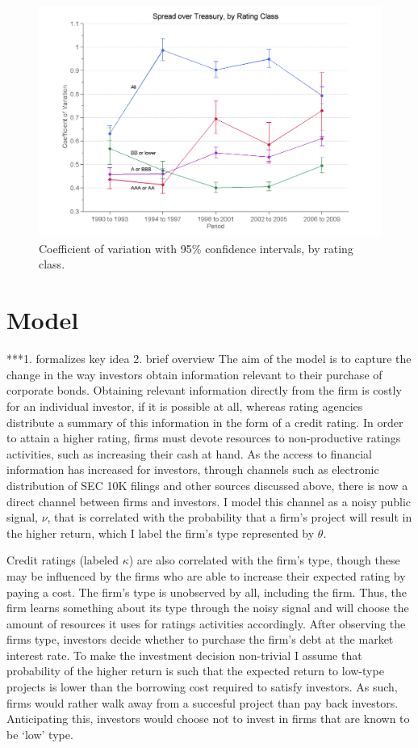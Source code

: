 \documentclass[titlepage]{article}
\begin{document}
\begin{figure}[ht]
\centering
\includegraphics[width=\textwidth]{CVCI.png}
\caption{Coefficient of variation with 95\% confidence intervals, by rating class.}
\label{fig:cov}
\end{figure}

\section{Model}
\label{sec:mod}
***1. formalizes key idea 2. brief overview
The aim of the model is to capture the change in the way investors obtain information relevant to their purchase of corporate bonds. Obtaining relevant information directly from the firm is costly for an individual investor, if it is possible at all, whereas rating agencies distribute a summary of this information in the form of a credit rating. In order to attain a higher rating, firms must devote resources to non-productive ratings activities, such as increasing their cash at hand. As the access to financial information has increased for investors, through channels such as electronic distribution of SEC 10K filings and other sources discussed above, there is now a direct channel between firms and investors. I model this channel as a noisy public signal, $\nu$, that is correlated with the probability that a firm's project will result in the higher return, which I label the firm's type represented by $\theta$. 

Credit ratings (labeled $\kappa$) are also correlated with the firm's type, though these may be influenced by the firms who are able to increase their expected rating by paying a cost. The firm's type is unobserved by all, including the firm. Thus, the firm learns something about its type through the noisy signal and will choose the amount of resources it uses for ratings activities accordingly. After observing the firms type, investors decide whether to purchase the firm's debt at the market interest rate. To make the investment decision non-trivial I assume that probability of the higher return is such that the expected return to low-type projects is lower than the borrowing cost required to satisfy investors. As such, firms would rather walk away from a succesful project than pay back investors. Anticipating this, investors would choose not to invest in firms that are known to be `low' type.
\end{document}
